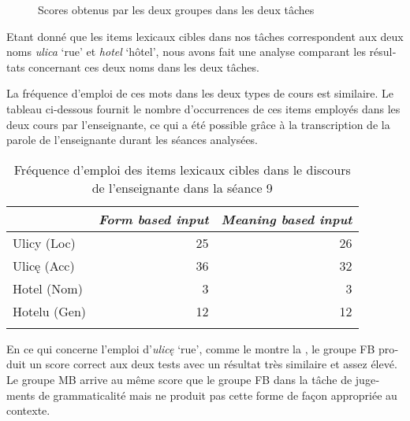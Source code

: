 \documentclass[output=paper]{langscibook}
\begin{document}
\begin{otherlanguage}{french}
\begin{figure}
\caption{\label{fig:watorek:9}Scores obtenus par les deux groupes dans les deux tâches}
\end{figure}

Etant donné que les items lexicaux cibles dans nos tâches correspondent aux deux noms \textit{ulica} `rue' et \textit{hotel} `hôtel', nous avons fait une analyse comparant les résultats concernant ces deux noms dans les deux tâches. 

La fréquence d’emploi de ces mots dans les deux types de cours est similaire. Le tableau ci-dessous fournit le nombre d’occurrences de ces items employés dans les deux cours par l’enseignante, ce qui a été possible grâce à la transcription de la parole de l’enseignante durant les séances analysées.


\begin{table}
\caption{\label{tab:watorek:5}Fréquence d’emploi des items lexicaux cibles dans le discours de l’enseignante dans la séance 9}
\begin{tabular}{lrr} 
\lsptoprule
            & \textit{Form based input} & \textit{Meaning based input}\\\midrule
Ulicy (Loc) & 25 & 26\\
Ulicę (Acc) & 36 & 32\\
Hotel (Nom) & 3 & 3\\
Hotelu (Gen) & 12 & 12\\
\lspbottomrule
\end{tabular}
\end{table}

En ce qui concerne l’emploi d’\textit{ulicę} `rue', comme le montre la , le groupe FB produit un score correct aux deux tests avec un résultat très similaire et assez élevé. Le groupe MB arrive au même score que le groupe FB dans la tâche de jugements de grammaticalité mais ne produit pas cette forme de façon appropriée au contexte.



\end{otherlanguage}
\end{document}
